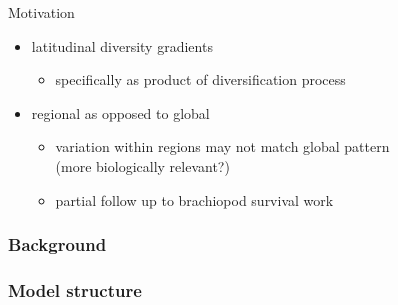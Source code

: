 \documentclass{beamer}
\begin{document}
\begin{frame}
  \begin{block}{Motivation}
    \begin{itemize}
      \item latitudinal diversity gradients
        \begin{itemize}
          \item specifically as product of diversification process
        \end{itemize}
      \item regional as opposed to global
        \begin{itemize}
          \item variation within regions may not match global pattern \\(more biologically relevant?)
          \item partial follow up to brachiopod survival work
        \end{itemize}
    \end{itemize}
  \end{block}
\end{frame}

\begin{frame}
  \frametitle{Background}
\end{frame}

\begin{frame}
  \frametitle{Model structure}
\end{frame}
\end{document}
